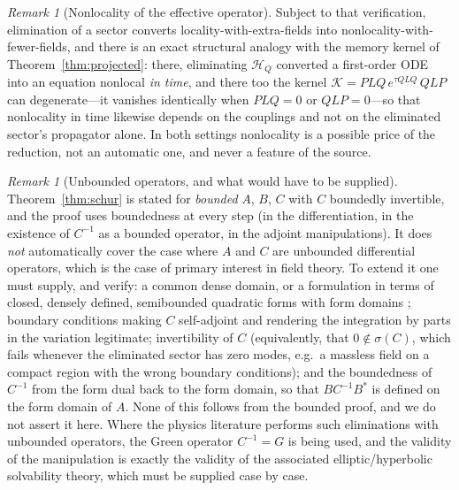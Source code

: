 \documentclass[11pt,reqno]{amsart}
\numberwithin{equation}{section}
\theoremstyle{plain}
\theoremstyle{definition}
\theoremstyle{remark}
\newtheorem{remark}[theorem]{Remark}
\newcommand{\HQ}{\mathcal{H}_{Q}}
\newcommand{\Kmem}{\mathcal{K}}
\begin{document}
\begin{remark}[Nonlocality of the effective operator]
Subject to that verification, elimination of a sector converts
locality-with-extra-fields into nonlocality-with-fewer-fields, and there is an exact
structural analogy with the memory kernel of Theorem~\ref{thm:projected}: there, eliminating
$\HQ$ converted a first-order ODE into an equation nonlocal \emph{in time}, and there too the
kernel $\Kmem=PLQ\,e^{\tau QLQ}\,QLP$ can degenerate---it vanishes identically when
$PLQ=0$ or $QLP=0$---so that nonlocality in time likewise depends on the couplings and not on
the eliminated sector's propagator alone. In both settings nonlocality is a possible price of
the reduction, not an automatic one, and never a feature of the source.
\end{remark}

\begin{remark}[Unbounded operators, and what would have to be supplied]
\label{rem:unbddschur}
Theorem~\ref{thm:schur} is stated for \emph{bounded} $A$, $B$, $C$ with $C$ boundedly
invertible, and the proof uses boundedness at every step (in the differentiation, in the
existence of $C^{-1}$ as a bounded operator, in the adjoint manipulations). It does
\emph{not} automatically cover the case where $A$ and $C$ are unbounded differential
operators, which is the case of primary interest in field theory. To extend it one must
supply, and verify: a common dense domain, or a formulation in terms of closed, densely
defined, semibounded quadratic forms with form domains \cite[Ch.~VI]{Kato}; boundary
conditions making $C$ self-adjoint and rendering the integration by parts in the variation
legitimate; invertibility of $C$ (equivalently, that $0\notin\sigma(C)$, which fails
whenever the eliminated sector has zero modes, e.g.\ a massless field on a compact region
with the wrong boundary conditions); and the boundedness of $C^{-1}$ from the form dual back
to the form domain, so that $BC^{-1}B^{*}$ is defined on the form domain of $A$. None of this
follows from the bounded proof, and we do not assert it here. Where the physics literature
performs such eliminations with unbounded operators, the Green operator $C^{-1}=G$ is being
used, and the validity of the manipulation is exactly the validity of the associated
elliptic/hyperbolic solvability theory, which must be supplied case by case.
\end{remark}
\end{document}
